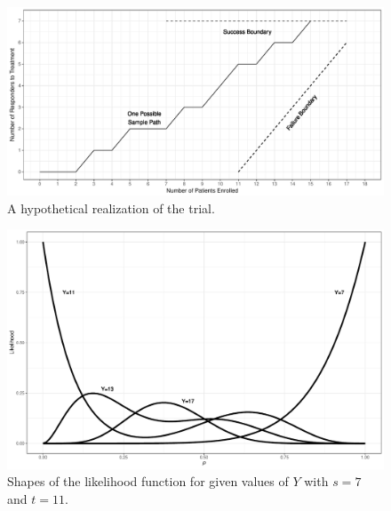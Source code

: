 \documentclass[sii]{ipart}
\begin{document}
\pagebreak

\begin{figure}[htbp!]
\centering
\includegraphics[width=\textwidth]{KanePlot.pdf}
\caption{
A hypothetical realization of the trial.
}
\label{fig:kane_viz}
\end{figure}

\pagebreak

\begin{figure}[htbp!]
\begin{center}
\includegraphics[width=\textwidth]{likelihood.pdf}
\end{center}
\caption{Shapes of the likelihood function for given values of $Y$ with 
$s=7$ and $t=11$.
\label{likelihood.fig}}
\end{figure}

\pagebreak
\end{document}
